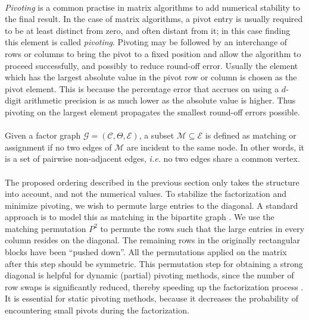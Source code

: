 \paragraph{} 
\textit{Pivoting} is a common practise in matrix algorithms to add numerical stability to the final result. In the case of matrix algorithms, a pivot entry is usually required to be at least distinct from zero, and often distant from it; in this case finding this element is called \textit{pivoting}. Pivoting may be followed by an interchange of rows or columns to bring the pivot to a fixed position and allow the algorithm to proceed successfully, and possibly to reduce round-off error. Usually the element which has the largest absolute value in the pivot row or column is chosen as the pivot element. This is because the percentage error that accrues on using a $d$-digit arithmetic precision is as much lower as the absolute value is higher. Thus pivoting on the largest element propagates the smallest round-off errors possible.
\paragraph{}
Given a factor graph $\mathcal{G} = (\mathcal{C}, \Theta, \mathcal{E})$, a subset $\mathcal{M} \subseteq \mathcal{E}$ is defined as matching or assignment if no two edges of $\mathcal{M}$ are incident to the same node. In other words, it is a set of pairwise non-adjacent edges, \textit{i.e.} no two edges share a common vertex.
\paragraph{}
The proposed ordering described in the previous section only takes the structure into account, and not the numerical values. To stabilize the factorization and minimize pivoting, we wish to permute large entries to the diagonal. A standard approach is to model this as matching in the bipartite graph \cite{matching}. We use the matching permutation $P^2$ to permute the rows such that the large entries in every column resides on the diagonal. The remaining rows in the originally rectangular blocks have been “pushed down”. All the permutations applied on the matrix after this step should be symmetric. This permutation step for obtaining a strong diagonal is helpful for dynamic (partial) pivoting methods, since the number of row swaps is significantly reduced, thereby speeding up the factorization process \cite{matching}. It is essential for static pivoting methods, because it decreases the probability of encountering small pivots during the factorization.
